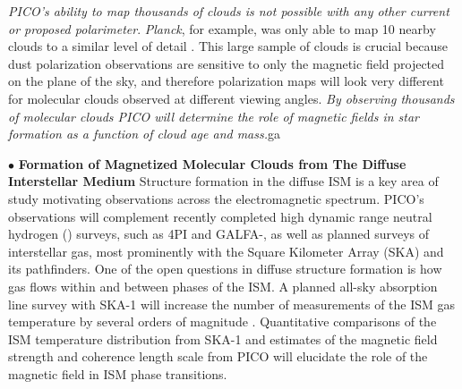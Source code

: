 \documentclass[PICOReport.tex]{subfiles}
\begin{document}
{\em PICO's ability to map thousands of clouds is not possible with any other current or proposed polarimeter}. {\em Planck}, for example, was only able to map 10 nearby clouds to a similar level of detail \citep{Planck:XXXV}. This large sample of clouds is crucial because dust polarization observations are sensitive to only the magnetic field projected on the plane of the sky, and therefore polarization maps will look very different for molecular clouds observed at different viewing angles.  {\em By observing thousands of molecular clouds PICO will determine the role of magnetic fields in star formation as a function of cloud age and mass.}ga

\noindent$\bullet$ {\bf Formation of Magnetized Molecular Clouds from The Diffuse Interstellar Medium} \hspace{0.1in}
Structure formation in the diffuse ISM is a key area of study motivating observations across the electromagnetic spectrum. PICO's observations will complement recently completed high dynamic range neutral hydrogen (\HI) surveys, such as \HI4PI \citep{HI4PI:2016} and GALFA-\hi \citep{Peek:2018}, as well as planned surveys of interstellar gas, most prominently with the Square Kilometer Array (SKA) and its pathfinders. One of the open questions in diffuse structure formation is how gas flows within and between phases of the ISM. A planned all-sky absorption line survey with SKA-1 will increase the number of measurements of the ISM gas temperature by several orders of magnitude \citep{McClure-Griffiths2015}. Quantitative comparisons of the ISM temperature distribution from SKA-1 and estimates of the magnetic field strength and coherence length scale from PICO will elucidate the role of the magnetic field in ISM phase transitions.
\end{document}
